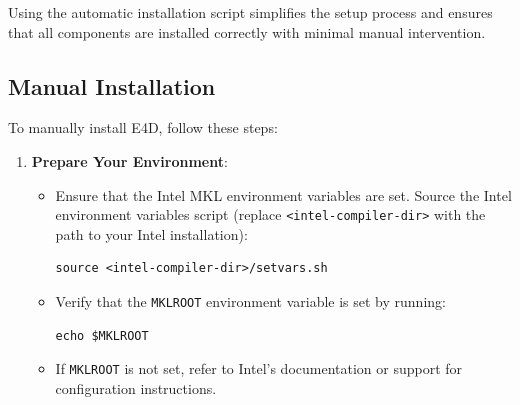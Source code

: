 \documentclass[a4paper,12pt]{article}
\begin{document}
Using the automatic installation script simplifies the setup process and ensures that all components are installed correctly with minimal manual intervention.

\subsection{Manual Installation}

To manually install E4D, follow these steps:

\begin{enumerate}
    \item \textbf{Prepare Your Environment}:
        \begin{itemize}
            \item Ensure that the Intel MKL environment variables are set. Source the Intel environment variables script (replace \texttt{<intel-compiler-dir>} with the path to your Intel installation):
            \begin{verbatim}
source <intel-compiler-dir>/setvars.sh
            \end{verbatim}
            \item Verify that the \texttt{MKLROOT} environment variable is set by running:
            \begin{verbatim}
echo $MKLROOT
            \end{verbatim}
            \item If \texttt{MKLROOT} is not set, refer to Intel’s documentation or support for configuration instructions.
        \end{itemize}


\end{enumerate}
\end{document}
